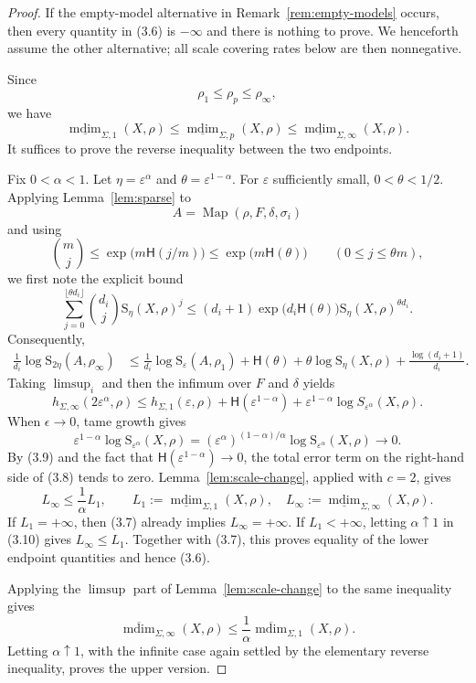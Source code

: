 \documentclass[10pt,a4paper]{amsart}
\newcommand{\Map}{\operatorname{Map}}
\newcommand{\cH}{\mathsf H}
\newcommand{\mdim}{\operatorname{mdim}}
\begin{document}
\begin{proof}
If the empty-model alternative in Remark~\ref{rem:empty-models} occurs, then every quantity in (3.6) is $-\infty$ and there is nothing to prove. We henceforth assume the other alternative; all scale covering rates below are then nonnegative.

Since
\[
 \rho_1\leq\rho_p\leq\rho_\infty,
\]
 we have
\[
 \underline{\mdim}_{\Sigma,1}(X,\rho)
 \leq\underline{\mdim}_{\Sigma,p}(X,\rho)
 \leq\underline{\mdim}_{\Sigma,\infty}(X,\rho).
 \tag{3.7}
\]
It suffices to prove the reverse inequality between the two endpoints.

Fix $0<\alpha<1$. Let $\eta=\varepsilon^\alpha$ and $\theta=\varepsilon^{1-\alpha}$. For $\varepsilon$ sufficiently small, $0<\theta<1/2$. Applying Lemma~\ref{lem:sparse} to
\[
 A=\Map(\rho,F,\delta,\sigma_i)
\]
and using
\[
 \binom mj\leq \exp\bigl(m\cH(j/m)\bigr)
 \leq \exp\bigl(m\cH(\theta)\bigr)
 \qquad(0\leq j\leq\theta m),
\]
we first note the explicit bound
\[
 \sum_{j=0}^{\lfloor\theta d_i\rfloor}
 \binom{d_i}{j}\mathrm{S}_\eta(X,\rho)^j
 \leq (d_i+1)\exp\bigl(d_i\cH(\theta)\bigr)
 \mathrm{S}_\eta(X,\rho)^{\theta d_i}.
\]
Consequently,
\begin{align*}
 \frac1{d_i}\log \mathrm{S}_{2\eta}(A,\rho_\infty)
 &\leq \frac1{d_i}\log \mathrm{S}_\varepsilon(A,\rho_1)
 +\cH(\theta)
 +\theta\log \mathrm{S}_\eta(X,\rho)
 +\frac{\log(d_i+1)}{d_i}.
\end{align*}
Taking $\limsup_i$ and then the infimum over $F$ and $\delta$ yields
\[
 h_{\Sigma,\infty}(2\varepsilon^\alpha,\rho)
 \leq h_{\Sigma,1}(\varepsilon,\rho)
 +\cH(\varepsilon^{1-\alpha})
 +\varepsilon^{1-\alpha}
   \log S_{\varepsilon^\alpha}(X,\rho).
 \tag{3.8}
\]
When $\epsilon\to 0$, tame growth gives
\[
 \varepsilon^{1-\alpha}
 \log \mathrm{S}_{\varepsilon^\alpha}(X,\rho)
 = (\varepsilon^\alpha)^{(1-\alpha)/\alpha}
 \log \mathrm{S}_{\varepsilon^\alpha}(X,\rho)
 \longrightarrow0.
 \tag{3.9}
\]
By (3.9) and the fact that $\cH(\varepsilon^{1-\alpha})\to0$, the total error term on the right-hand side of (3.8) tends to zero. Lemma~\ref{lem:scale-change}, applied with $c=2$, gives
\[
 L_\infty
 \leq \frac1\alpha L_1,
 \qquad
 L_1:=\underline{\mdim}_{\Sigma,1}(X,\rho),
 \quad
 L_\infty:=\underline{\mdim}_{\Sigma,\infty}(X,\rho).
 \tag{3.10}
\]
If $L_1=+\infty$, then (3.7) already implies $L_\infty=+\infty$. If $L_1<+\infty$, letting $\alpha\uparrow1$ in (3.10) gives $L_\infty\leq L_1$. Together with (3.7), this proves equality of the lower endpoint quantities and hence (3.6).

Applying the $\limsup$ part of Lemma~\ref{lem:scale-change} to the same inequality gives
\[
 \overline{\mdim}_{\Sigma,\infty}(X,\rho)
 \leq \frac1\alpha
 \overline{\mdim}_{\Sigma,1}(X,\rho).
\]
Letting $\alpha\uparrow1$, with the infinite case again settled by the elementary reverse inequality, proves the upper version.
\end{proof}
\end{document}
